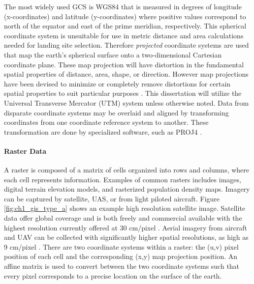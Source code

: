 The most widely used \acf{GCS} is WGS84 \cite{wgs84} that is measured in degrees of longitude (x-coordinates) and latitude (y-coordinates) where positive values correspond to north of the equator and east of the prime meridian, respectively. This spherical coordinate system is unsuitable for use in metric distance and area calculations needed for landing site selection. Therefore \emph{projected} coordinate systems are used that map the earth's spherical surface onto a two-dimensional Cartesian coordinate plane.
These map projection will have distortion in the fundamental spatial properties of distance, area, shape, or direction. However map projections have been devised to minimize or completely remove distortions for certain spatial properties to suit particular purposes \cite{GIS_demystified}. This dissertation will utilize the Universal Transverse Mercator (UTM) system unless otherwise noted. 
Data from disparate coordinate systems may be overlaid and aligned by transforming coordinates from one coordinate reference system to another. These transformation are done by specialized software, such as PROJ4 \cite{proj_contributors_proj_2018}.


\paragraph{Raster Data}

A raster is composed of a matrix of cells organized into rows and columns, where each cell represents information. Examples of common rasters includes images, digital terrain elevation models, and rasterized population density maps. Imagery can be captured by satellite, \ac{UAS}, or from light piloted aircraft.  Figure \ref{fig:ch1_gis_type_a} shows an example high resolution satellite image. Satellite data offer global coverage and is both freely and commercial available with the highest resolution currently offered at 30 cm/pixel \cite{2041-210X.12973}.  Aerial imagery from aircraft and UAV can be collected with significantly higher spatial resolutions, as high as 9 cm/pixel \cite{SHAO2021126954}. 
There are two coordinate systems within a raster: the (u,v) pixel position of each cell and the corresponding (x,y) map projection position. An affine matrix is used to convert between the two coordinate systems such that every pixel corresponds to a precise location on the surface of the earth.

